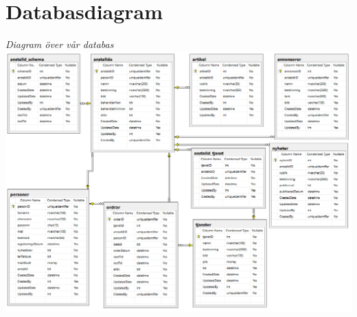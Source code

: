 \documentclass[11pt, titlepage, oneside, a4paper]{article}	%
\begin{document}
\newpage
\section{Databasdiagram}
\begin{center}
	\textit{Diagram över vår databas}
    \includegraphics[width=1\textwidth]{../Bilder/databasdiagram.png}
\end{center}
\newpage
\end{document}
